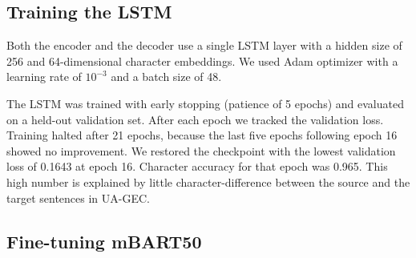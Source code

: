 \documentclass[11pt]{article}
\begin{document}
\begin{table}[h]
\centering
{}
\caption{Training and fine-tuning configuration for the character-level LSTM and the fine-tuned mBART50 baseline.}
\label{tab:hyperparams}
\end{table}


\subsection{Training the LSTM}

Both the encoder and the decoder use a single LSTM layer with a hidden size of 256 and 64-dimensional character embeddings. We used Adam optimizer with a learning rate of $10^{-3}$ and a batch size of 48.

The LSTM was trained with early stopping (patience of 5 epochs) and evaluated on a held-out validation set. After each epoch we tracked the validation loss. Training halted after 21 epochs, because the last five epochs following epoch 16 showed no improvement. We restored the checkpoint with the lowest validation loss of 0.1643 at epoch 16. Character accuracy for that epoch was 0.965. This high number is explained by little character-difference between the source and the target sentences in UA-GEC.


\subsection{Fine-tuning mBART50}
\end{document}
